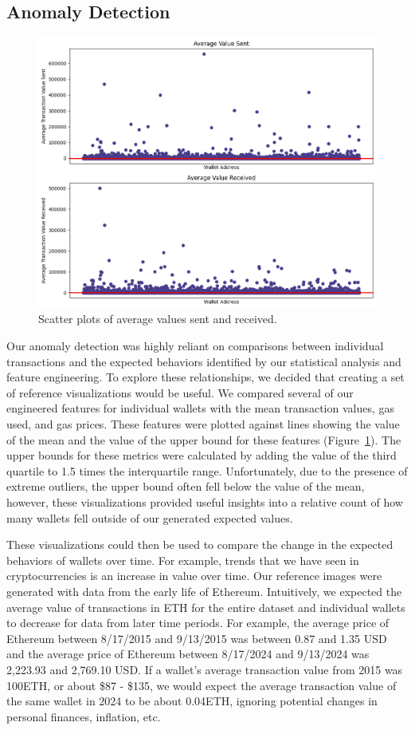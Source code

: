 \documentclass[sigconf]{acmart}
\begin{document}
\subsection{Anomaly Detection}
\begin{figure}[H]
    \centering
    \includegraphics[width=0.8\linewidth]{M6-2-avg-val.png}
    \caption{Scatter plots of average values sent and received.}
    \label{fig:m6StackedAvgVal}
\end{figure}
Our anomaly detection was highly reliant on comparisons between individual transactions and the expected behaviors identified by our statistical analysis and feature engineering. To explore these relationships, we decided that creating a set of reference visualizations would be useful. We compared several of our engineered features for individual wallets with the mean transaction values, gas used, and gas prices. These features were plotted against lines showing the value of the mean and the value of the upper bound for these features (Figure~\ref{fig:m6StackedAvgVal}). The upper bounds for these metrics were calculated by adding the value of the third quartile to 1.5 times the interquartile range. Unfortunately, due to the presence of extreme outliers, the upper bound often fell below the value of the mean, however, these visualizations provided useful insights into a relative count of how many wallets fell outside of our generated expected values.  

	These visualizations could then be used to compare the change in the expected behaviors of wallets over time. For example, trends that we have seen in cryptocurrencies is an increase in value over time. Our reference images were generated with data from the early life of Ethereum. Intuitively, we expected the average value of transactions in ETH for the entire dataset and individual wallets to decrease for data from later time periods. For example, the average price of Ethereum between 8/17/2015 and 9/13/2015 was between 0.87 and 1.35 USD and the average price of Ethereum between 8/17/2024 and 9/13/2024 was 2,223.93 and 2,769.10 USD. If a wallet’s average transaction value from 2015 was 100ETH, or about \$87 - \$135, we would expect the average transaction value of the same wallet in 2024 to be about 0.04ETH, ignoring potential changes in personal finances, inflation, etc. 
\end{document}
